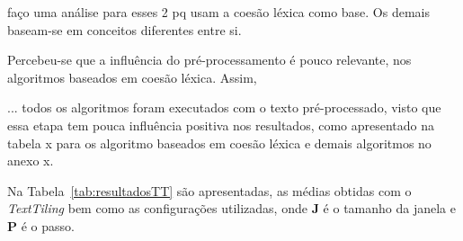faço uma análise para esses 2 pq usam a coesão léxica como base. Os demais baseam-se em conceitos diferentes entre si.











































Percebeu-se que a influência do pré-processamento é pouco relevante, nos algoritmos baseados em coesão léxica. Assim, 


... todos os algoritmos foram executados com o texto pré-processado, visto que essa etapa tem pouca influência positiva nos resultados, 
como apresentado na tabela x para os algoritmo baseados em coesão léxica e demais algoritmos no anexo x.





















































  Na Tabela~\ref{tab:resultadosTT} são apresentadas, as médias obtidas com o \textit{TextTiling} bem como as configurações utilizadas, onde \textbf{J} é o tamanho da janela e \textbf{P} é o passo.



